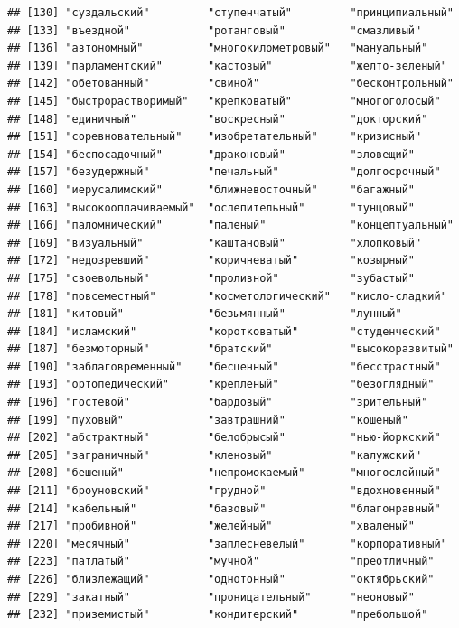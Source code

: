 \documentclass[11pt]{article}\usepackage[]{graphicx}\usepackage[]{color}
\makeatletter
\newenvironment{kframe}{%
 \def\at@end@of@kframe{}%
 \ifinner\ifhmode%
  \def\at@end@of@kframe{\end{minipage}}%
  \begin{minipage}{\columnwidth}%
 \fi\fi%
 \def\FrameCommand##1{\hskip\@totalleftmargin \hskip-\fboxsep
 \colorbox{shadecolor}{##1}\hskip-\fboxsep
     \hskip-\linewidth \hskip-\@totalleftmargin \hskip\columnwidth}%
 \MakeFramed {\advance\hsize-\width
   \@totalleftmargin\z@ \linewidth\hsize
   \@setminipage}}%
 {\par\unskip\endMakeFramed%
 \at@end@of@kframe}
\newenvironment{knitrout}{}{} %
\makeatother
\begin{document}
\begin{knitrout}
\begin{kframe}
\begin{verbatim}
## [130] "суздальский"         "ступенчатый"         "принципиальный"     
## [133] "въездной"            "ротанговый"          "смазливый"          
## [136] "автономный"          "многокилометровый"   "мануальный"         
## [139] "парламентский"       "кастовый"            "желто-зеленый"      
## [142] "обетованный"         "свиной"              "бесконтрольный"     
## [145] "быстрорастворимый"   "крепковатый"         "многоголосый"       
## [148] "единичный"           "воскресный"          "докторский"         
## [151] "соревновательный"    "изобретательный"     "кризисный"          
## [154] "беспосадочный"       "драконовый"          "зловещий"           
## [157] "безудержный"         "печальный"           "долгосрочный"       
## [160] "иерусалимский"       "ближневосточный"     "багажный"           
## [163] "высокооплачиваемый"  "ослепительный"       "тунцовый"           
## [166] "паломнический"       "паленый"             "концептуальный"     
## [169] "визуальный"          "каштановый"          "хлопковый"          
## [172] "недозревший"         "коричневатый"        "козырный"           
## [175] "своевольный"         "проливной"           "зубастый"           
## [178] "повсеместный"        "косметологический"   "кисло-сладкий"      
## [181] "китовый"             "безымянный"          "лунный"             
## [184] "исламский"           "коротковатый"        "студенческий"       
## [187] "безмоторный"         "братский"            "высокоразвитый"     
## [190] "заблаговременный"    "бесценный"           "бесстрастный"       
## [193] "ортопедический"      "крепленый"           "безоглядный"        
## [196] "гостевой"            "бардовый"            "зрительный"         
## [199] "пуховый"             "завтрашний"          "кошеный"            
## [202] "абстрактный"         "белобрысый"          "нью-йоркский"       
## [205] "заграничный"         "кленовый"            "калужский"          
## [208] "бешеный"             "непромокаемый"       "многослойный"       
## [211] "броуновский"         "грудной"             "вдохновенный"       
## [214] "кабельный"           "базовый"             "благонравный"       
## [217] "пробивной"           "желейный"            "хваленый"           
## [220] "месячный"            "заплесневелый"       "корпоративный"      
## [223] "патлатый"            "мучной"              "преотличный"        
## [226] "близлежащий"         "однотонный"          "октябрьский"        
## [229] "закатный"            "проницательный"      "неоновый"           
## [232] "приземистый"         "кондитерский"        "пребольшой"         

\end{verbatim}
\end{kframe}
\end{knitrout}
\end{document}
